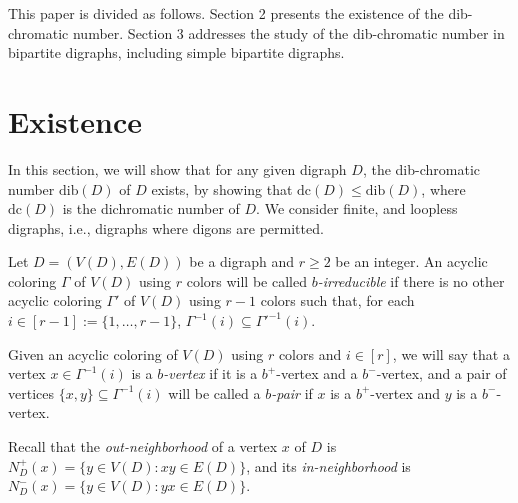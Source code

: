 \documentclass[12pt]{article}
\begin{document}
This paper is divided as follows. Section 2 presents the existence of the dib-chromatic number. Section 3 addresses the study of the dib-chromatic number in bipartite digraphs, including simple bipartite digraphs.


\section{Existence}

In this section, we will show that for any given digraph $D$, the dib-chromatic number $\text{dib}(D)$ of $D$ exists, by showing that $\text{dc}(D) \leq \text{dib}(D)$, where $\text{dc}(D)$ is the  dichromatic number of $D$. We consider finite, and loopless digraphs, i.e., digraphs where digons are permitted.

Let $D=(V(D), E(D))$ be a digraph and $r\geq 2$ be an integer. 
An acyclic coloring $\Gamma$ of $V(D)$ using $r$ colors will be called {\it $b$-irreducible} if there is no other acyclic coloring $\Gamma'$ of $V(D)$ using $r-1$ colors such that, for each $i\in [r-1]:= \{1,\dots,r-1\}$, $\Gamma^{-1}(i)\subseteq \Gamma'^{-1}(i)$.


Given an acyclic coloring  of $V(D)$ using $r$ colors and $i\in [r]$, we will say that a vertex $x\in\Gamma^{-1}(i)$ is a \emph{$b$-vertex} if it is a $b^+$-vertex and a $b^-$-vertex, and a pair of vertices $\{x,y\} \subseteq \Gamma^{-1}(i)$ will be called a \emph{$b$-pair} if $x$ is a $b^+$-vertex and $y$ is a $b^-$-vertex.

Recall that the \emph{out-neighborhood} of a vertex $x$ of $D$ is $N^+_D(x)=\{y\in V(D)\colon xy \in E(D)\}$, and its \emph{in-neighborhood} is $N^-_D(x)=\{y\in V(D)\colon yx \in E(D)\}$.
\end{document}
